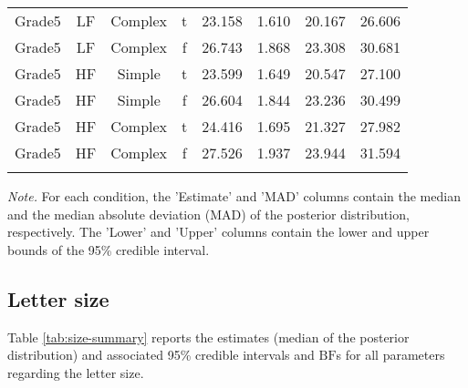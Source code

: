 \documentclass[
  11pt,
  english,
  ,doc,floatsintext]{apa6}
\begin{document}
\begin{table}[htb]
\begin{center}
\begin{threeparttable}
{\begin{tabular}{cccccccc}
Grade5 & LF & Complex & t & 23.158 & 1.610 & 20.167 & 26.606\\
Grade5 & LF & Complex & f & 26.743 & 1.868 & 23.308 & 30.681\\
Grade5 & HF & Simple & t & 23.599 & 1.649 & 20.547 & 27.100\\
Grade5 & HF & Simple & f & 26.604 & 1.844 & 23.236 & 30.499\\
Grade5 & HF & Complex & t & 24.416 & 1.695 & 21.327 & 27.982\\
Grade5 & HF & Complex & f & 27.526 & 1.937 & 23.944 & 31.594\\
\bottomrule
\addlinespace
\end{tabular}

}

\begin{tablenotes}[para]
\normalsize{\textit{Note.} For each condition, the 'Estimate' and 'MAD' columns contain the
    median and the median absolute deviation (MAD) of the posterior distribution,
    respectively. The 'Lower' and 'Upper' columns contain the lower and upper
    bounds of the 95\% credible interval.}
\end{tablenotes}

\end{threeparttable}
\end{center}

\end{table}

\hypertarget{letter-size}{%
\subsection{Letter size}\label{letter-size}}

Table \ref{tab:size-summary} reports the estimates (median of the posterior distribution) and associated 95\% credible intervals and \(\text{BF}\)s for all parameters regarding the letter size.
\end{document}
